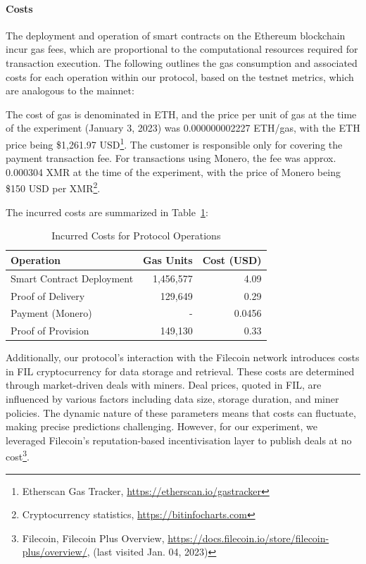 \documentclass[pdftex,twocolumn,epjc3]{svjour3}
\begin{document}
\paragraph{Costs}
The deployment and operation of smart contracts on the Ethereum blockchain incur gas fees, which are proportional to the computational resources required for transaction execution. The following outlines the gas consumption and associated costs for each operation within our protocol, based on the testnet metrics, which are analogous to the mainnet:

The cost of gas is denominated in ETH, and the price per unit of gas at the time of the experiment (January 3, 2023) was 0.000000002227 ETH/gas, with the ETH price being \$1,261.97 USD\footnote{Etherscan Gas Tracker, \url{https://etherscan.io/gastracker}}. The customer is responsible only for covering the payment transaction fee. For transactions using Monero, the fee was approx. 0.000304 XMR at the time of the experiment, with the price of Monero being \$150 USD per XMR\footnote{Cryptocurrency statistics, \url{https://bitinfocharts.com}}.

The incurred costs are summarized in Table~\ref{table:costs}:

\begin{table}
\caption{Incurred Costs for Protocol Operations}
\centering
\label{table:costs}
\begin{tabular}{lrr}
\hline
\textbf{Operation}            & \textbf{Gas Units} & \textbf{Cost (USD)} \\
\hline
Smart Contract Deployment     & 1,456,577          & 4.09                \\
Proof of Delivery             & 129,649            & 0.29                \\
Payment (Monero)              & -                  & 0.0456              \\
Proof of Provision            & 149,130            & 0.33                \\
\hline
\end{tabular}
\end{table}

Additionally, our protocol's interaction with the Filecoin network introduces costs in FIL cryptocurrency for data storage and retrieval. These costs are determined through market-driven deals with miners. Deal prices, quoted in FIL, are influenced by various factors including data size, storage duration, and miner policies. The dynamic nature of these parameters means that costs can fluctuate, making precise predictions challenging. However, for our experiment, we leveraged Filecoin's reputation-based incentivisation layer to publish deals at no cost\footnote{Filecoin, Filecoin Plus Overview, \url{https://docs.filecoin.io/store/filecoin-plus/overview/}, (last visited Jan. 04, 2023)}.
\end{document}

